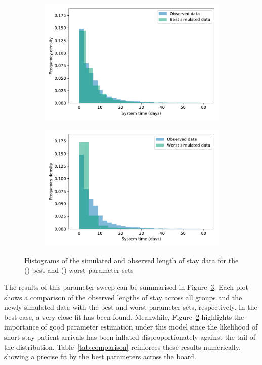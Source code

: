 \begin{figure}
    \centering%
    \begin{subfigure}{\imgwidth}
        \includegraphics[width=\linewidth]{best_params}
        \caption{}\label{fig:best_params}
    \end{subfigure}

    \begin{subfigure}{\imgwidth}
        \includegraphics[width=\linewidth]{worst_params}
        \caption{}\label{fig:worst_params}
    \end{subfigure}
    \caption{Histograms of the simulated and observed length of stay data for
             the () best and ()
             worst parameter sets}\label{fig:params}
\end{figure}

The results of this parameter sweep can be summarised in
Figure~\ref{fig:params}. Each plot shows a comparison of the observed lengths of
stay across all groups and the newly simulated data with the best and worst
parameter sets, respectively. In the best case, a very close fit has been found.
Meanwhile, Figure~\ref{fig:worst_params} highlights the importance of good
parameter estimation under this model since the likelihood of short-stay patient
arrivals has been inflated disproportionately against the tail of the
distribution. Table~\ref{tab:comparison} reinforces these results numerically,
showing a precise fit by the best parameters across the board.

